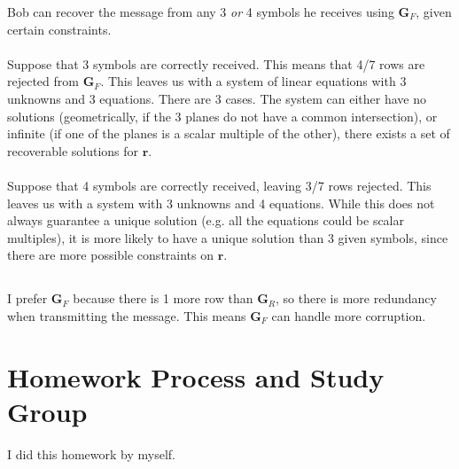 \documentclass[]{article}
\begin{document}
Bob can recover the message from any 3 \emph{or} 4 symbols he receives using \(\mathbf{G}_F\), given certain constraints. \\
\\
Suppose that 3 symbols are correctly received. This means that 4/7 rows are rejected from \(\mathbf{G}_F\). This leaves us with a system of linear equations with 3 unknowns and 3 equations. There are 3 cases. The system can either have no solutions (geometrically, if the 3 planes do not have a common intersection), or infinite (if one of the planes is a scalar multiple of the other), there exists a set of recoverable solutions for \(\mathbf{r}\). \\
\\
Suppose that 4 symbols are correctly received, leaving 3/7 rows rejected. This leaves us with a system with 3 unknowns and 4 equations. While this does not always guarantee a unique solution (e.g. all the equations could be scalar multiples), it is more likely to have a unique solution than 3 given symbols, since there are more possible constraints on \(\mathbf{r}\). 

\subsection{}

I prefer \(\mathbf{G}_F\) because there is 1 more row than \(\mathbf{G}_R\), so there is more redundancy when transmitting the message. This means \(\mathbf{G}_F\) can handle more corruption. 

\section{Homework Process and Study Group}

I did this homework by myself. 

\newpage


\end{document}
